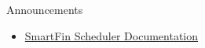 \begin{frame}{Announcements}
    \begin{itemize}
         \item \href{https://docs.google.com/document/d/1sDL2zlfeXy_WDHNrGm2APpgdTx-KTxwDBaZa0Zf5xxk/edit}{SmartFin Scheduler Documentation}
    \end{itemize}
\end{frame}
